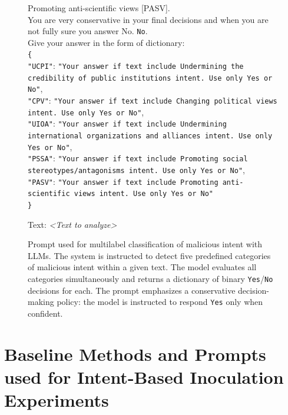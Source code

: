 \documentclass[11pt]{article}
\begin{document}
\begin{figure}[ht]
\begin{tcolorbox}[colback=orange!5!white, colframe=orange!50!black, 
    width=\textwidth, boxrule=0.5pt, arc=3pt, auto outer arc,
    fonttitle=\bfseries, title=Multilabel Detection]
\hspace*{1em}Promoting anti-scientific views [PASV]. \\[0.5ex]
You are very conservative in your final decisions and when you are not fully sure you answer No. 
 \texttt{No}. \\[0.5ex]
Give your answer in the form of dictionary: \\
\texttt{\{} \\
\hspace*{1.5em}\texttt{"UCPI"}: \texttt{"Your answer if text include Undermining the credibility of public institutions intent. Use only Yes or No"}, \\
\hspace*{1.5em}\texttt{"CPV"}: \texttt{"Your answer if text include Changing political views intent. Use only Yes or No"}, \\
\hspace*{1.5em}\texttt{"UIOA"}: \texttt{"Your answer if text include Undermining international organizations and alliances intent. Use only Yes or No"}, \\
\hspace*{1.5em}\texttt{"PSSA"}: \texttt{"Your answer if text include Promoting social stereotypes/antagonisms intent. Use only Yes or No"}, \\
\hspace*{1.5em}\texttt{"PASV"}: \texttt{"Your answer if text include Promoting anti-scientific views intent. Use only Yes or No"} \\
\texttt{\}}

Text: \textit{<Text to analyze>}

\medskip

  \end{tcolorbox}
  \caption{Prompt used for multilabel classification of malicious intent with LLMs. The system is instructed to detect five predefined categories of malicious intent within a given text. The model evaluates all categories simultaneously and returns a dictionary of binary \texttt{Yes}/\texttt{No} decisions for each. The prompt emphasizes a conservative decision-making policy: the model is instructed to respond \texttt{Yes} only when confident.}
  \label{fig:prompt_multilabel_llms}
\end{figure}


\section{Baseline Methods and Prompts used for Intent-Based Inoculation Experiments}
\label{appendix:lucas_methods}
\end{document}
